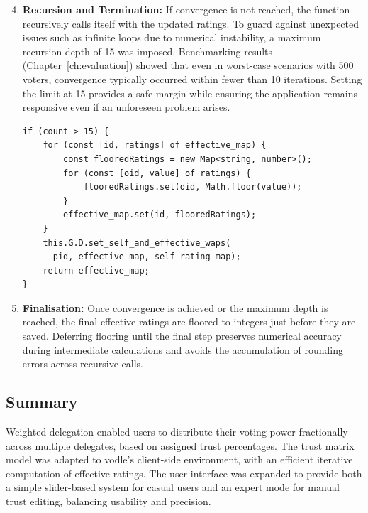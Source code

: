 \begin{enumerate}
    \setcounter{enumi}{3}
    \item \textbf{Recursion and Termination:} If convergence is not reached, the function recursively calls itself with the updated ratings. To guard against unexpected issues such as infinite loops due to numerical instability, a maximum recursion depth of 15 was imposed. Benchmarking results (Chapter~\ref{ch:evaluation}) showed that even in worst-case scenarios with 500 voters, convergence typically occurred within fewer than 10 iterations. Setting the limit at 15 provides a safe margin while ensuring the application remains responsive even if an unforeseen problem arises.


\begin{verbatim}
if (count > 15) {
    for (const [id, ratings] of effective_map) {
        const flooredRatings = new Map<string, number>();
        for (const [oid, value] of ratings) {
            flooredRatings.set(oid, Math.floor(value));
        }
        effective_map.set(id, flooredRatings);
    }
    this.G.D.set_self_and_effective_waps(
      pid, effective_map, self_rating_map);
    return effective_map;
}
\end{verbatim}

    \item \textbf{Finalisation:} Once convergence is achieved or the maximum depth is reached, the final effective ratings are floored to integers just before they are saved. Deferring flooring until the final step preserves numerical accuracy during intermediate calculations and avoids the accumulation of rounding errors across recursive calls.
\end{enumerate}


\subsection{Summary}

Weighted delegation enabled users to distribute their voting power fractionally across multiple delegates, based on assigned trust percentages. The trust matrix model was adapted to vodle's client-side environment, with an efficient iterative computation of effective ratings. The user interface was expanded to provide both a simple slider-based system for casual users and an expert mode for manual trust editing, balancing usability and precision.


